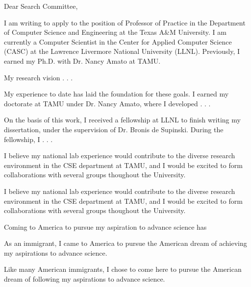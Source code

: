 \documentclass[12pt]{article}
\begin{document}
Dear Search Committee,

I am writing to apply to the position of Professor of Practice in the Department of Computer Science and Engineering at the Texas A\&M University.  I am currently a Computer Scientist in the Center for Applied Computer Science (CASC) at the Lawrence Livermore National University (LLNL).  Previously, I earned my Ph.D. with Dr. Nancy Amato at TAMU.

My research vision . . .

My experience to date has laid the foundation for these goals.  I earned my doctorate at TAMU under Dr. Nancy Amato, where I developed . . .

On the basis of this work, I received a fellowship at LLNL to finish writing my dissertation, under the supervision of Dr. Bronis de Supinski.
During the fellowship, I . . .

I believe my national lab experience would contribute to the diverse research environment in the CSE department at TAMU, and I would be excited to form collaborations with several groups thoughout the University.

I believe my national lab experience would contribute to the diverse research environment in the CSE department at TAMU, and I would be excited to form collaborations with several groups thoughout the University.

Coming to America to pursue my aspiration to advance science has

As an immigrant, I came to America to pursue the American dream of achieving my aspirations to advance science.

Like many American immigrants, I chose to come here to pursue the American dream of following my aspirations to advance science.
\end{document}
